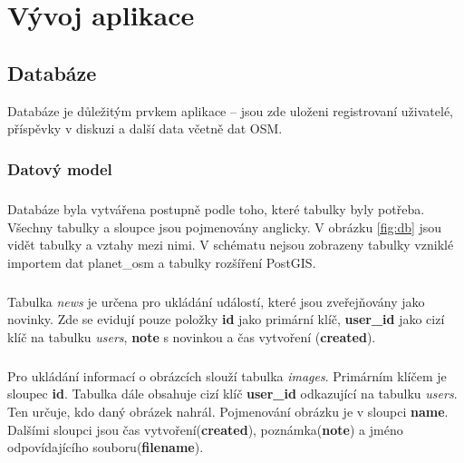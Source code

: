 \documentclass[11pt,a4paper,titlepage,oneside]{book}
\begin{document}
\chapter{Vývoj aplikace}
		\section{Databáze}
Databáze je důležitým prvkem aplikace  -- jsou zde uloženi registrovaní uživatelé, příspěvky v diskuzi a další data včetně dat \ac{OSM}.
			\subsection{Datový model}
				\paragraph{}  Databáze byla vytvářena postupně podle toho, které tabulky byly potřeba. Všechny tabulky a sloupce jsou pojmenovány anglicky. V obrázku \ref{fig:db} jsou vidět tabulky a vztahy mezi nimi. V schématu nejsou zobrazeny tabulky vzniklé importem dat planet\_osm a tabulky rozšíření PostGIS. 
				\paragraph{}Tabulka \textit{news} je určena pro ukládání událostí, které jsou zveřejňovány jako novinky. Zde se evidují pouze položky \textbf{id} jako primární klíč, \textbf{user\_id} jako cizí klíč na tabulku \textit{users}, \textbf{note} s novinkou a čas vytvoření (\textbf{created}).

				\paragraph{}Pro ukládání informací o obrázcích slouží tabulka \textit{images}. Primárním klíčem je sloupec \textbf{id}. Tabulka dále obsahuje cizí klíč \textbf{user\_id} odkazující na tabulku \textit{users}. Ten určuje, kdo daný obrázek nahrál. Pojmenování obrázku je v sloupci \textbf{name}. Dalšími sloupci jsou čas vytvoření(\textbf{created}), poznámka(\textbf{note}) a jméno odpovídajícího souboru(\textbf{filename}).


\end{document}
